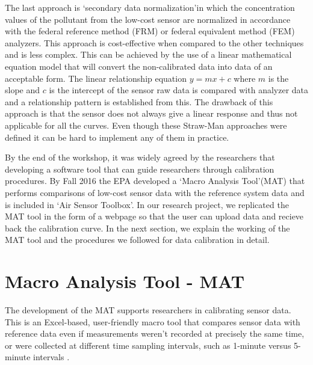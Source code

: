 The last approach is \lq{secondary data normalization}\rq in which the concentration values of the pollutant from the low-cost sensor are normalized in accordance with the federal reference method (FRM) or federal equivalent method (FEM) analyzers. This approach is cost-effective when compared to the other techniques and is less complex. This can be achieved by the use of a linear mathematical equation model that will convert the non-calibrated data into data of an acceptable form. The linear relationship equation $ y = mx + c $ where $ m $ is the slope and $ c $ is the intercept of the sensor raw data is compared with analyzer data and a relationship pattern is established from this. The drawback of this approach is that the sensor does not always give a linear response and thus not applicable for all the curves. Even though these Straw-Man approaches were defined it can be hard to implement any of them in practice. 

By the end of the workshop, it was widely agreed by the researchers that developing a software tool that can guide researchers through calibration procedures. By Fall 2016 the EPA developed a \lq{Macro Analysis Tool}\rq (MAT) that performs comparisons of low-cost sensor data with the reference system data and is included in \lq{Air Sensor Toolbox}\rq \cite{airsensortoolbox}.  In our research project, we replicated the MAT tool in the form of a webpage so that the user can upload data and recieve back the calibration curve. In the next section, we explain the working of the MAT tool and the procedures we followed for data calibration in detail.


\section{Macro Analysis Tool - MAT}


The development of the MAT supports researchers in calibrating sensor data. This is an Excel-based, user-friendly macro tool that compares sensor data with reference data \cite{National2017} even if measurements weren’t recorded at precisely the same time, or were collected at different time sampling intervals, such as 1-minute versus 5-minute intervals \cite{mattool} . 



